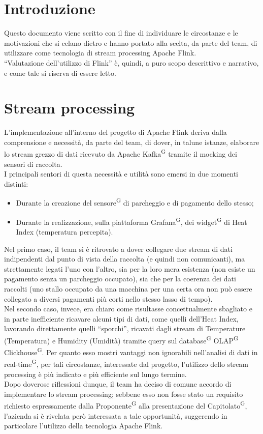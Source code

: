 \documentclass[8pt]{article}
\newcommand{\glossterm}[1]{#1\textsuperscript{G}} %
\begin{document}
\section{Introduzione}
Questo documento viene scritto con il fine di individuare le circostanze e le motivazioni che si celano dietro e hanno portato alla scelta, da parte del team, di utilizzare come tecnologia di stream processing Apache Flink.\\
``Valutazione dell'utilizzo di Flink'' è, quindi, a puro scopo descrittivo e narrativo, e come tale si riserva di essere letto.

\section{Stream processing}
L'implementazione all'interno del progetto di Apache Flink deriva dalla comprensione e necessità, da parte del team, di dover, in talune istanze, elaborare lo stream grezzo di dati ricevuto da Apache \glossterm{Kafka} tramite il mocking dei sensori di raccolta.\\
I principali sentori di questa necessità e utilità sono emersi in due momenti distinti:
\begin{itemize}
\setlength\itemsep{0em}
    \item Durante la creazione del \glossterm{sensore} di parcheggio e di pagamento dello stesso;
    \item Durante la realizzazione, sulla piattaforma \glossterm{Grafana}, dei \glossterm{widget} di Heat Index (temperatura percepita).
\end{itemize}
Nel primo caso, il team si è ritrovato a dover collegare due stream di dati indipendenti dal punto di vista della raccolta (e quindi non comunicanti), ma strettamente legati l'uno con l'altro, sia per la loro mera esistenza (non esiste un pagamento senza un parcheggio occupato), sia che per la coerenza dei dati raccolti (uno stallo occupato da una macchina per una certa ora non può essere collegato a diversi pagamenti più corti nello stesso lasso di tempo).\\
Nel secondo caso, invece, era chiaro come risultasse concettualmente sbagliato e in parte inefficiente ricavare alcuni tipi di dati, come quelli dell'Heat Index, lavorando direttamente quelli ``sporchi'', ricavati dagli stream di Temperature (Temperatura) e Humidity (Umidità) tramite query sul \glossterm{database} \glossterm{OLAP} \glossterm{Clickhouse}. Per quanto esso mostri vantaggi non ignorabili nell'analisi di dati in \glossterm{real-time}, per tali circostanze, interessate dal progetto, l'utilizzo dello stream processing è più indicato e più efficiente sul lungo termine.\\
Dopo doverose riflessioni dunque, il team ha deciso di comune accordo di implementare lo stream processing; sebbene esso non fosse stato un requisito richiesto espressamente dalla \glossterm{Proponente} alla presentazione del \glossterm{Capitolato}, l'azienda si è rivelata però interessata a tale opportunità, suggerendo in particolare l'utilizzo della tecnologia Apache Flink.
\end{document}
